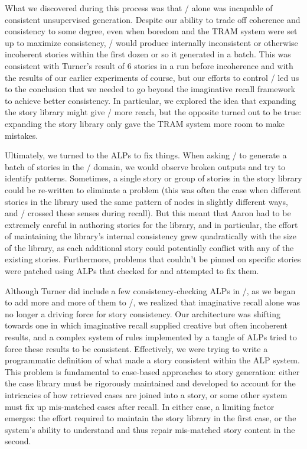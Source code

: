 What we discovered during this process was that \skald/ alone was incapable of consistent unsupervised generation.
%
Despite our ability to trade off coherence and consistency to some degree, even when boredom and the TRAM system were set up to maximize consistency, \skald/ would produce internally inconsistent or otherwise incoherent stories within the first dozen or so it generated in a batch.
%
This was consistent with Turner's result of 6 stories in a run before incoherence and with the results of our earlier experiments of course, but our efforts to control \skald/ led us to the conclusion that we needed to go beyond the imaginative recall framework to achieve better consistency. 
%
In particular, we explored the idea that expanding the story library might give \skald/ more reach, but the opposite turned out to be true: expanding the story library only gave the TRAM system more room to make mistakes.


Ultimately, we turned to the ALPs to fix things.
%
When asking \skald/ to generate a batch of stories in the \problemplanets/ domain, we would observe broken outputs and try to identify patterns.
%
Sometimes, a single story or group of stories in the story library could be re-written to eliminate a problem (this was often the case when different stories in the library used the same pattern of nodes in slightly different ways, and \skald/ crossed these senses during recall).
%
But this meant that Aaron had to be extremely careful in authoring stories for the library, and in particular, the effort of maintaining the library's internal consistency grew quadratically with the size of the library, as each additional story could potentially conflict with any of the existing stories.
%
Furthermore, problems that couldn't be pinned on specific stories were patched using ALPs that checked for and attempted to fix them.


Although Turner did include a few consistency-checking ALPs in \minstrel/, as we began to add more and more of them to \skald/, we realized that imaginative recall alone was no longer a driving force for story consistency.
%
Our architecture was shifting towards one in which imaginative recall supplied creative but often incoherent results, and a complex system of rules implemented by a tangle of ALPs tried to force these results to be consistent.
%
Effectively, we were trying to write a programmatic definition of what made a story consistent within the ALP system.
%
This problem is fundamental to case-based approaches to story generation: either the case library must be rigorously maintained and developed to account for the intricacies of how retrieved cases are joined into a story, or some other system must fix up mis-matched cases after recall.
%
In either case, a limiting factor emerges: the effort required to maintain the story library in the first case, or the system's ability to understand and thus repair mis-matched story content in the second.


